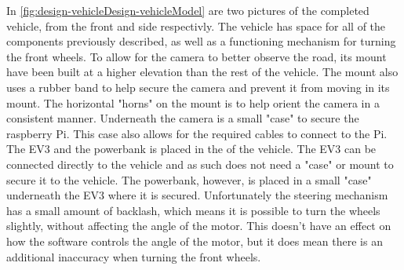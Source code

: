 In \autoref{fig:design-vehicleDesign-vehicleModel} are two pictures of the completed vehicle, from the front and side respectivly.
The vehicle has space for all of the components previously described, as well as a functioning mechanism for turning the front wheels.
To allow for the camera to better observe the road, its mount have been built at a higher elevation than the rest of the vehicle.
The mount also uses a rubber band to help secure the camera and prevent it from moving in its mount.
The horizontal "horns" on the mount is to help orient the camera in a consistent manner.
Underneath the camera is a small "case" to secure the raspberry Pi.
This case also allows for the required cables to connect to the Pi.
The EV3 and the powerbank is placed in the of the vehicle.
The EV3 can be connected directly to the vehicle and as such does not need a "case" or mount to secure it to the vehicle.
The powerbank, however, is placed in a small "case" underneath the EV3 where it is secured.
Unfortunately the steering mechanism has a small amount of backlash, which means it is possible to turn the wheels slightly, without affecting the angle of the motor.
This doesn't have an effect on how the software controls the angle of the motor, but it does mean there is an additional inaccuracy when turning the front wheels.
